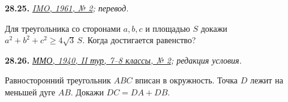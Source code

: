 \noindent\begin{minipage}[t]{\linewidth}\textbf{28.25.}\starmark{} {\small\itshape\href{https://www.imo-official.org/assets/documents/problems/1961/1961_eng.pdf}{IMO, 1961, № 2}; перевод.}\par Для треугольника со сторонами \(a,b,c\) и площадью \(S\) докажи \(a^2+b^2+c^2\ge4\sqrt3\,S\). Когда достигается равенство?\par\end{minipage}\par
\noindent\begin{minipage}[t]{\linewidth}\textbf{28.26.}\starmark{} {\small\itshape\href{https://mmo.mccme.ru/books/mmo-35-57.pdf}{ММО, 1940, II тур, 7–8 классы, № 2}; редакция условия.}\par Равносторонний треугольник \(ABC\) вписан в окружность. Точка \(D\) лежит на меньшей дуге \(AB\). Докажи \(DC=DA+DB\).\par\end{minipage}\par
\endgroup
